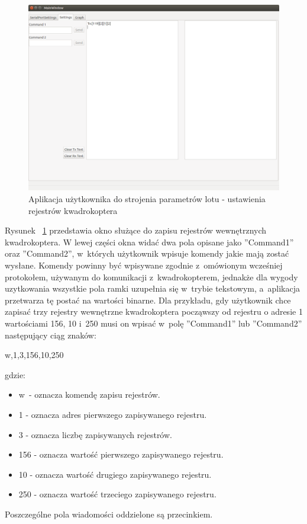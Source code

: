 \begin{figure}[H]
	\centering
	\includegraphics[scale=0.4]{Pictures/QuadroTune/QuadroTuneSettings.png}
	\caption[Aplikacja użytkownika do strojenia parametrów lotu - ustawienia rejestrów kwadrokoptera]{Aplikacja użytkownika do strojenia parametrów lotu - ustawienia rejestrów kwadrokoptera}
	\label{fig:QuadroTune_screen2}
\end{figure}

Rysunek ~\ref{fig:QuadroTune_screen2} przedstawia okno służące do zapisu rejestrów wewnętrznych kwadrokoptera. W lewej części okna widać dwa pola opisane jako ''Command1'' oraz ''Command2'', w~których użytkownik wpisuje komendy jakie mają zostać wysłane. Komendy powinny być wpisywane zgodnie z~omówionym wcześniej protokołem, używanym do komunikacji z~kwadrokopterem, jednakże dla wygody uzytkowania wszystkie pola ramki uzupełnia się w~trybie tekstowym, a~aplikacja przetwarza tę postać na wartości binarne. Dla przykładu, gdy użytkownik chce zapisać trzy rejestry wewnętrzne kwadrokoptera począwszy od rejestru o adresie 1 wartościami 156, 10 i~250 musi on wpisać w~polę ''Command1'' lub ''Command2'' następujący ciąg znaków:

w,1,3,156,10,250

gdzie:
\begin{itemize}
	\item w~- oznacza komendę zapisu rejestrów.
	\item 1 - oznacza adres pierwszego zapisywanego rejestru.
	\item 3 - oznacza liczbę zapisywanych rejestrów.
	\item 156 - oznacza wartość pierwszego zapisywanego rejestru.
	\item 10 - oznacza wartość drugiego zapisywanego rejestru.
	\item 250 - oznacza wartość trzeciego zapisywanego rejestru.
\end{itemize}
Poszczególne pola wiadomości oddzielone są przecinkiem.

